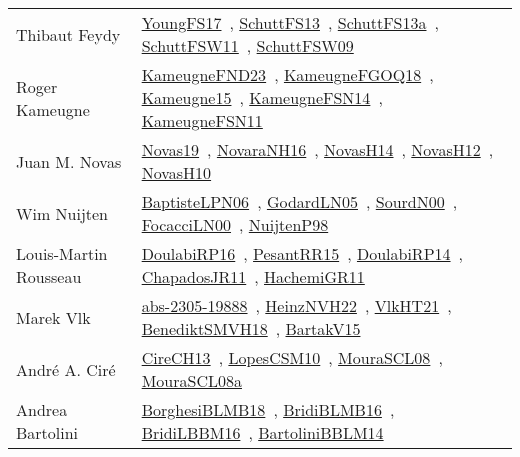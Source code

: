 {\begin{longtable}{p{4cm}p{20cm}}
Thibaut Feydy & \href{works/YoungFS17.pdf}{YoungFS17}~\cite{YoungFS17}, \href{works/SchuttFS13.pdf}{SchuttFS13}~\cite{SchuttFS13}, \href{works/SchuttFS13a.pdf}{SchuttFS13a}~\cite{SchuttFS13a}, \href{works/SchuttFSW11.pdf}{SchuttFSW11}~\cite{SchuttFSW11}, \href{works/SchuttFSW09.pdf}{SchuttFSW09}~\cite{SchuttFSW09}\\
Roger Kameugne & \href{works/KameugneFND23.pdf}{KameugneFND23}~\cite{KameugneFND23}, \href{works/KameugneFGOQ18.pdf}{KameugneFGOQ18}~\cite{KameugneFGOQ18}, \href{works/Kameugne15.pdf}{Kameugne15}~\cite{Kameugne15}, \href{works/KameugneFSN14.pdf}{KameugneFSN14}~\cite{KameugneFSN14}, \href{works/KameugneFSN11.pdf}{KameugneFSN11}~\cite{KameugneFSN11}\\
Juan M. Novas & \href{works/Novas19.pdf}{Novas19}~\cite{Novas19}, \href{works/NovaraNH16.pdf}{NovaraNH16}~\cite{NovaraNH16}, \href{works/NovasH14.pdf}{NovasH14}~\cite{NovasH14}, \href{works/NovasH12.pdf}{NovasH12}~\cite{NovasH12}, \href{works/NovasH10.pdf}{NovasH10}~\cite{NovasH10}\\
Wim Nuijten & \href{}{BaptisteLPN06}~\cite{BaptisteLPN06}, \href{works/GodardLN05.pdf}{GodardLN05}~\cite{GodardLN05}, \href{works/SourdN00.pdf}{SourdN00}~\cite{SourdN00}, \href{works/FocacciLN00.pdf}{FocacciLN00}~\cite{FocacciLN00}, \href{works/NuijtenP98.pdf}{NuijtenP98}~\cite{NuijtenP98}\\
Louis{-}Martin Rousseau & \href{works/DoulabiRP16.pdf}{DoulabiRP16}~\cite{DoulabiRP16}, \href{works/PesantRR15.pdf}{PesantRR15}~\cite{PesantRR15}, \href{works/DoulabiRP14.pdf}{DoulabiRP14}~\cite{DoulabiRP14}, \href{works/ChapadosJR11.pdf}{ChapadosJR11}~\cite{ChapadosJR11}, \href{works/HachemiGR11.pdf}{HachemiGR11}~\cite{HachemiGR11}\\
Marek Vlk & \href{works/abs-2305-19888.pdf}{abs-2305-19888}~\cite{abs-2305-19888}, \href{works/HeinzNVH22.pdf}{HeinzNVH22}~\cite{HeinzNVH22}, \href{works/VlkHT21.pdf}{VlkHT21}~\cite{VlkHT21}, \href{works/BenediktSMVH18.pdf}{BenediktSMVH18}~\cite{BenediktSMVH18}, \href{works/BartakV15.pdf}{BartakV15}~\cite{BartakV15}\\
Andr{\'{e}} A. Cir{\'{e}} & \href{works/CireCH13.pdf}{CireCH13}~\cite{CireCH13}, \href{works/LopesCSM10.pdf}{LopesCSM10}~\cite{LopesCSM10}, \href{works/MouraSCL08.pdf}{MouraSCL08}~\cite{MouraSCL08}, \href{works/MouraSCL08a.pdf}{MouraSCL08a}~\cite{MouraSCL08a}\\
Andrea Bartolini & \href{works/BorghesiBLMB18.pdf}{BorghesiBLMB18}~\cite{BorghesiBLMB18}, \href{works/BridiBLMB16.pdf}{BridiBLMB16}~\cite{BridiBLMB16}, \href{works/BridiLBBM16.pdf}{BridiLBBM16}~\cite{BridiLBBM16}, \href{works/BartoliniBBLM14.pdf}{BartoliniBBLM14}~\cite{BartoliniBBLM14}\\

\end{longtable}}

